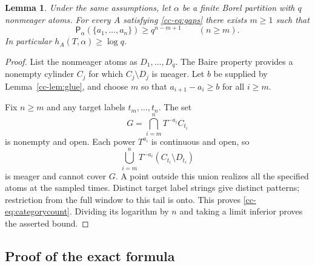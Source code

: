 \documentclass[11pt,reqno]{amsart}
\numberwithin{equation}{section}
\newtheorem{lemma}[theorem]{Lemma}
\theoremstyle{definition}
\newcommand{\Patt}{\mathsf P}
\begin{document}
\begin{lemma}\label{cc-lem:borel}
Under the same assumptions, let $\alpha$ be a finite Borel partition
with $q$ nonmeager atoms. For every $A$ satisfying \eqref{cc-eq:gaps} there
exists $m\ge1$ such that
\begin{equation}\label{cc-eq:categorycount}
 \Patt_\alpha(\{a_1,\ldots,a_n\})\ge q^{n-m+1}\qquad(n\ge m).
\end{equation}
In particular $h_A(T,\alpha)\ge\log q$.
\end{lemma}
\begin{proof}
List the nonmeager atoms as $D_1,\ldots,D_q$. The Baire property
provides a nonempty cylinder $C_j$ for which $C_j\setminus D_j$ is
meager. Let $b$ be supplied by Lemma~\ref{cc-lem:glue}, and choose $m$ so
that $a_{i+1}-a_i\ge b$ for all $i\ge m$.

Fix $n\ge m$ and any target labels $t_m,\ldots,t_n$. The set
\[
 G=\bigcap_{i=m}^n T^{-a_i}C_{t_i}
\]
is nonempty and open. Each power $T^{a_i}$ is continuous and open, so
\[
 \bigcup_{i=m}^n T^{-a_i}(C_{t_i}\setminus D_{t_i})
\]
is meager and cannot cover $G$. A point outside this union realizes
all the specified atoms at the sampled times. Distinct target label
strings give distinct patterns; restriction from the full window to
this tail is onto. This proves \eqref{cc-eq:categorycount}. Dividing its
logarithm by $n$ and taking a limit inferior proves the asserted bound.
\end{proof}

\subsection{Proof of the exact formula}
\end{document}
